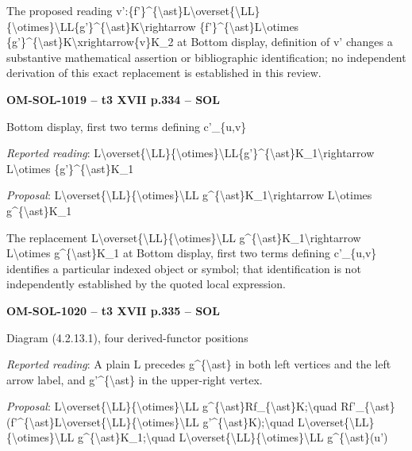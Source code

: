 The proposed reading v':\{f'\}\textasciicircum{}\{\textbackslash{}ast\}L\textbackslash{}overset\{\textbackslash{}LL\}\{\textbackslash{}otimes\}\textbackslash{}LL\{g'\}\textasciicircum{}\{\textbackslash{}ast\}K\textbackslash{}rightarrow \{f'\}\textasciicircum{}\{\textbackslash{}ast\}L\textbackslash{}otimes \{g'\}\textasciicircum{}\{\textbackslash{}ast\}K\textbackslash{}xrightarrow\{v\}K\_2 at Bottom display, definition of v' changes a substantive mathematical assertion or bibliographic identification; no independent derivation of this exact replacement is established in this review.\par
\par\noindent\textbf{OM-SOL-1019 -- t3 XVII p.334 -- SOL}\par
Bottom display, first two terms defining c'\_\{u,v\}\par
\emph{Reported reading}: L\textbackslash{}overset\{\textbackslash{}LL\}\{\textbackslash{}otimes\}\textbackslash{}LL\{g'\}\textasciicircum{}\{\textbackslash{}ast\}K\_1\textbackslash{}rightarrow L\textbackslash{}otimes \{g'\}\textasciicircum{}\{\textbackslash{}ast\}K\_1\par
\emph{Proposal}: L\textbackslash{}overset\{\textbackslash{}LL\}\{\textbackslash{}otimes\}\textbackslash{}LL g\textasciicircum{}\{\textbackslash{}ast\}K\_1\textbackslash{}rightarrow L\textbackslash{}otimes g\textasciicircum{}\{\textbackslash{}ast\}K\_1\par
The replacement L\textbackslash{}overset\{\textbackslash{}LL\}\{\textbackslash{}otimes\}\textbackslash{}LL g\textasciicircum{}\{\textbackslash{}ast\}K\_1\textbackslash{}rightarrow L\textbackslash{}otimes g\textasciicircum{}\{\textbackslash{}ast\}K\_1 at Bottom display, first two terms defining c'\_\{u,v\} identifies a particular indexed object or symbol; that identification is not independently established by the quoted local expression.\par
\par\noindent\textbf{OM-SOL-1020 -- t3 XVII p.335 -- SOL}\par
Diagram (4.2.13.1), four derived-functor positions\par
\emph{Reported reading}: A plain L precedes g\textasciicircum{}\{\textbackslash{}ast\} in both left vertices and the left arrow label, and g'\textasciicircum{}\{\textbackslash{}ast\} in the upper-right vertex.\par
\emph{Proposal}: L\textbackslash{}overset\{\textbackslash{}LL\}\{\textbackslash{}otimes\}\textbackslash{}LL g\textasciicircum{}\{\textbackslash{}ast\}Rf\_\{\textbackslash{}ast\}K;\textbackslash{}quad Rf'\_\{\textbackslash{}ast\}(f'\textasciicircum{}\{\textbackslash{}ast\}L\textbackslash{}overset\{\textbackslash{}LL\}\{\textbackslash{}otimes\}\textbackslash{}LL g'\textasciicircum{}\{\textbackslash{}ast\}K);\textbackslash{}quad L\textbackslash{}overset\{\textbackslash{}LL\}\{\textbackslash{}otimes\}\textbackslash{}LL g\textasciicircum{}\{\textbackslash{}ast\}K\_1;\textbackslash{}quad L\textbackslash{}overset\{\textbackslash{}LL\}\{\textbackslash{}otimes\}\textbackslash{}LL g\textasciicircum{}\{\textbackslash{}ast\}(u')\par
